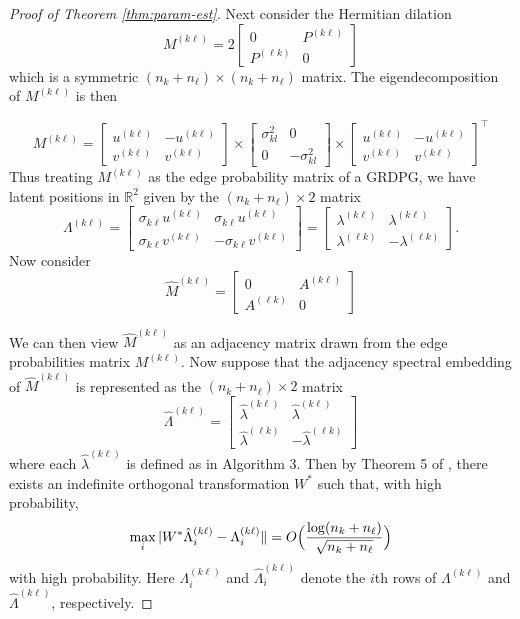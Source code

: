 \documentclass[
  11pt,
]{article}
\theoremstyle{definition}
\theoremstyle{definition}
\theoremstyle{definition}
\theoremstyle{definition}
\theoremstyle{remark}
\begin{document}
\begin{proof}[Proof of Theorem \ref{thm:param-est}]
Next consider the Hermitian dilation
\[
M^{(k \ell)} = 2 \begin{bmatrix} 0 & P^{(k \ell)} \\ P^{(\ell k)} & 0 \end{bmatrix}
\]
which is a symmetric \((n_k + n_\ell) \times (n_k + n_\ell)\) matrix. 
The eigendecomposition of \(M^{(k \ell)}\) is then

\[M^{(k \ell)} = 
\begin{bmatrix} u^{(k \ell)} & -u^{(k \ell)} \\ v^{(k \ell)} & v^{(k \ell)} \end{bmatrix} \times 
\begin{bmatrix} \sigma^2_{kl} & 0 \\ 0 & -\sigma^2_{kl} \end{bmatrix} \times
\begin{bmatrix} u^{(k \ell)} & -u^{(k \ell)} \\ v^{(k \ell)} & v^{(k \ell)} \end{bmatrix}^\top\]
Thus treating \(M^{(k \ell)}\) as the edge probability matrix of a GRDPG, we have latent positions in \(\mathbb{R}^2\) given by the $(n_k + n_{\ell}) \times 2$ matrix
\[\Lambda^{(k \ell)} = \begin{bmatrix} 
  \sigma_{k \ell} u^{(k \ell)} & \sigma_{k \ell} u^{(k \ell)} \\ 
  \sigma_{k \ell} v^{(k \ell)} & -\sigma_{k \ell} v^{(k \ell)} 
\end{bmatrix} = 
\begin{bmatrix} 
  \lambda^{(k \ell)} & \lambda^{(k \ell)} \\ 
  \lambda^{( \ell k)} & -\lambda^{( \ell k)} 
\end{bmatrix}.\]
Now consider
\[\hat{M}^{(k \ell)} = \begin{bmatrix} 0 & A^{(k \ell)} \\ A^{(\ell k)} & 0 \end{bmatrix}\]

We can then view \(\hat{M}^{(k \ell)}\) as an adjacency matrix drawn from
the edge probabilities matrix \(M^{(k \ell)}\). Now suppose that the adjacency spectral
embedding of $\hat{M}^{(k \ell)}$ is represented as the $(n_k +
n_{\ell}) \times 2$ matrix
\[\hat{\Lambda}^{(k \ell)} = \begin{bmatrix} 
  \hat{\lambda}^{(k \ell)} & \hat{\lambda}^{(k \ell)} \\ 
  \hat{\lambda}^{(\ell k)} & -\hat{\lambda}^{(\ell k)} 
\end{bmatrix}\]
where each \(\hat{\lambda}^{(k \ell)}\) is defined as in Algorithm 3. Then
by Theorem 5 of \citet{rubindelanchy2017statistical}, there
exists an indefinite orthogonal transformation $W^{*}$ such that,  with
high probability,
$$\max_{i} |W^{*} \hat{\Lambda}_{i}^{(k \ell)} - \Lambda_{i}^{(k \ell)} \| =
O\Bigl(\frac{\log (n_k + n_{\ell})}{\sqrt{n_k + n_{\ell}}}\Bigr)$$
with high probability. Here $\Lambda_{i}^{(k \ell)}$ and
$\hat{\Lambda}_i^{(k \ell)}$ denote the $i$th rows of $\Lambda^{(k
  \ell)}$ and $\hat{\Lambda}^{(k \ell)}$, respectively. 


\end{proof}
\end{document}

